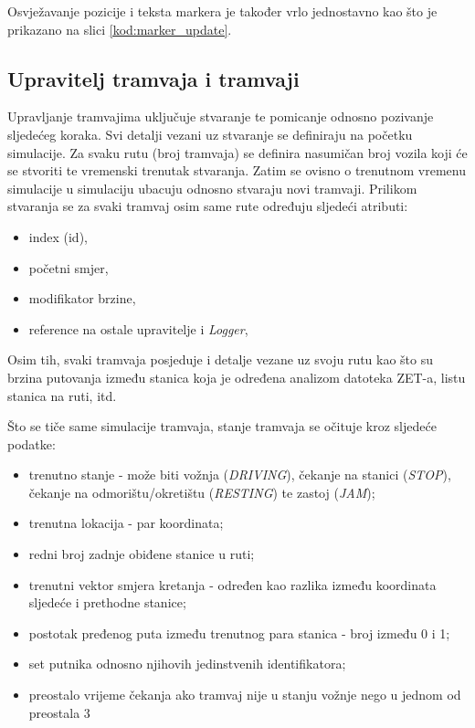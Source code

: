 \documentclass[times, utf8, diplomski]{fer}
\begin{document}
Osvježavanje pozicije i teksta markera je također vrlo jednostavno kao što je prikazano na slici \ref{kod:marker_update}.


\subsection{Upravitelj tramvaja i tramvaji}
Upravljanje tramvajima uključuje stvaranje  te pomicanje odnosno pozivanje sljedećeg koraka. Svi detalji vezani uz stvaranje se definiraju na početku simulacije. Za svaku rutu (broj tramvaja) se definira nasumičan broj vozila koji će se stvoriti te vremenski trenutak stvaranja. Zatim se ovisno o trenutnom vremenu simulacije u simulaciju ubacuju odnosno stvaraju novi tramvaji. Prilikom stvaranja se za svaki tramvaj osim same rute određuju sljedeći atributi:

\begin{itemize}
    \item index (id),
    \item početni smjer,
    \item modifikator brzine,
    \item reference na ostale upravitelje i \emph{Logger},
\end{itemize}

Osim tih, svaki tramvaja posjeduje i detalje vezane uz svoju rutu kao što su brzina putovanja između stanica koja je određena analizom datoteka ZET-a, listu stanica na ruti, itd.

Što se tiče same simulacije tramvaja, stanje tramvaja se očituje kroz sljedeće podatke:
\begin{itemize}
    \item trenutno stanje  - može biti vožnja (\emph{DRIVING}), čekanje na stanici (\emph{STOP}), čekanje na odmorištu/okretištu (\emph{RESTING}) te zastoj (\emph{JAM});
    \item trenutna lokacija - par koordinata;
    \item redni broj zadnje obiđene stanice u ruti;
    \item trenutni vektor smjera kretanja - određen kao razlika između koordinata sljedeće i prethodne stanice;
    \item postotak pređenog puta između trenutnog para stanica - broj između 0 i 1;
    \item set putnika odnosno njihovih jedinstvenih identifikatora;
    \item preostalo vrijeme čekanja ako tramvaj nije u stanju vožnje nego u jednom od preostala 3
\end{itemize}
\end{document}
